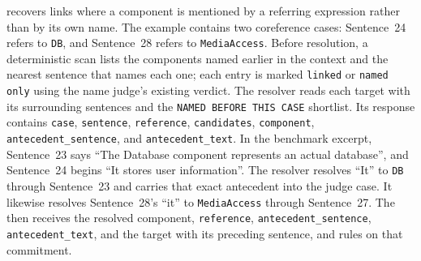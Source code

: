 \linkerC recovers links where a component is mentioned by a referring expression rather than by its own name.
The example contains two coreference cases: Sentence~24 refers to \texttt{DB}, and Sentence~28 refers to \texttt{MediaAccess}.
Before resolution, a deterministic scan lists the components named earlier in the context and the nearest sentence that names each one; each entry is marked \texttt{linked} or \texttt{named only} using the name judge's existing verdict.
The resolver reads each target with its surrounding sentences and the \texttt{NAMED BEFORE THIS CASE} shortlist.
Its response contains \texttt{case}, \texttt{sentence}, \texttt{reference}, \texttt{candidates}, \texttt{component}, \texttt{antecedent\_sentence}, and \texttt{antecedent\_text}.
In the benchmark excerpt, Sentence~23 says ``The Database component represents an actual database'', and Sentence~24 begins ``It stores user information''.
The resolver resolves ``It'' to \texttt{DB} through Sentence~23 and carries that exact antecedent into the judge case.
It likewise resolves Sentence~28's ``it'' to \texttt{MediaAccess} through Sentence~27.
The \corefValidator{} then receives the resolved component, \texttt{reference}, \texttt{antecedent\_sentence}, \texttt{antecedent\_text}, and the target with its preceding sentence, and rules on that commitment.

